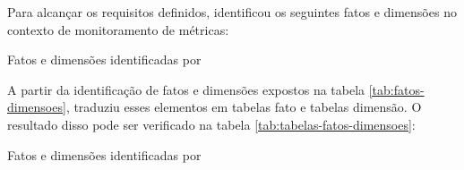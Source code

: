Para alcançar os requisitos definidos,  identificou os seguintes fatos e dimensões no contexto de monitoramento de métricas:

\begin{table}[!ht]
	\begin{center}
	
	 
	\caption{Fatos e dimensões identificadas por }
	\label{tab:fatos-dimensoes}
	\end{center}
	\end{table}	
	\FloatBarrier


A partir da identificação de fatos e dimensões expostos na tabela \ref{tab:fatos-dimensoes},   traduziu esses elementos em tabelas fato e tabelas dimensão. O resultado disso pode ser verificado na tabela \ref{tab:tabelas-fatos-dimensoes}:

\begin{table}[!ht]
	\begin{center}
	
	 
	\caption{Fatos e dimensões identificadas por }
	\label{tab:tabelas-fatos-dimensoes}
	\end{center}
	\end{table}	
	\FloatBarrier


 


